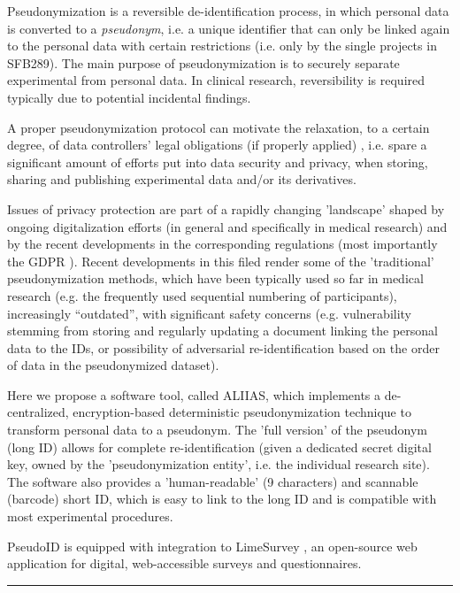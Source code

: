 Pseudonymization is a reversible de-identification process, in which personal data is converted to a \emph{pseudonym}, i.e. a unique identifier that can only be linked again to the personal data with certain restrictions (i.e. only by the single projects in SFB289). The main purpose of pseudonymization is to securely separate experimental from personal data. In clinical research, reversibility is required typically due to potential incidental findings.

A proper pseudonymization protocol can motivate the relaxation, to a certain degree, of data controllers’ legal obligations (if properly applied) \cite{pseudonym}, i.e. spare a significant amount of efforts put into data security and privacy, when storing, sharing and publishing experimental data and/or its derivatives.

Issues of privacy protection are part of a rapidly changing 'landscape' shaped by ongoing digitalization efforts (in general and specifically in medical research) and by the recent developments in the corresponding regulations (most importantly the GDPR \cite{gdpr}). Recent developments in  this filed render some of the 'traditional' pseudonymization methods, which have been typically used so far in medical research (e.g. the frequently used sequential numbering of participants), increasingly “outdated”, with significant safety concerns (e.g. vulnerability stemming from storing and regularly updating a document linking the personal data to the IDs, or possibility of adversarial re-identification based on the order of data in the pseudonymized dataset).

Here we propose a software tool, called ALIIAS, which implements a de-centralized, encryption-based deterministic pseudonymization technique to transform personal data to a pseudonym.
The 'full version' of the pseudonym (long ID) allows for complete re-identification (given a dedicated secret digital key, owned by the 'pseudonymization entity', i.e. the individual research site). The software also provides a 'human-readable' (9 characters) and scannable (barcode)  short ID, which is easy to link to the long ID and is compatible with most experimental procedures.

PseudoID is equipped with integration to LimeSurvey \cite{limesurvey}, an open-source web application for digital, web-accessible surveys and questionnaires.

\par\noindent\rule{\textwidth\color{pniblue}}{0.4pt}

